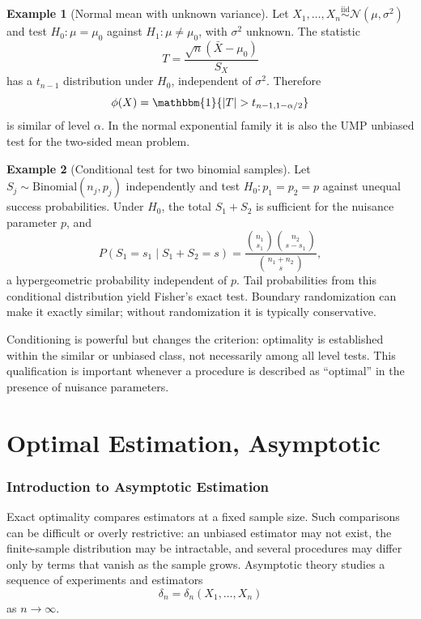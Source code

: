 \documentclass[12pt,oneside]{book}
\numberwithin{equation}{section}
\theoremstyle{definition}
\newtheorem{example}{Example}[section]
\theoremstyle{plain}
\theoremstyle{remark}
\newcommand{\ind}{\mathbbm{1}}
\newcommand{\iid}{\overset{\text{iid}}{\sim}}
\newcommand{\abs}[1]{\left\lvert #1 \right\rvert}
\newcommand{\Normal}{\mathcal{N}}
\newcommand{\Bin}{\mathrm{Binomial}}
\begin{document}
\begin{example}[Normal mean with unknown variance]
Let $X_1,\ldots,X_n\iid\Normal(\mu,\sigma^2)$ and test
$H_0:\mu=\mu_0$ against $H_1:\mu\neq\mu_0$, with $\sigma^2$ unknown.  The
statistic
\[
    T=\frac{\sqrt n(\bar X-\mu_0)}{S_X}
\]
has a $t_{n-1}$ distribution under $H_0$, independent of $\sigma^2$.
Therefore
\[
    \phi(X)=\ind\{\abs T>t_{n-1,1-\alpha/2}\}
\]
is similar of level $\alpha$.  In the normal exponential family it is also
the UMP unbiased test for the two-sided mean problem.
\end{example}

\begin{example}[Conditional test for two binomial samples]
Let $S_j\sim\Bin(n_j,p_j)$ independently and test
$H_0:p_1=p_2=p$ against unequal success probabilities.  Under $H_0$, the
total $S_1+S_2$ is sufficient for the nuisance parameter $p$, and
\[
 P(S_1=s_1\mid S_1+S_2=s)
 =\frac{\binom{n_1}{s_1}\binom{n_2}{s-s_1}}
        {\binom{n_1+n_2}{s}},
\]
a hypergeometric probability independent of $p$.  Tail probabilities from
this conditional distribution yield Fisher's exact test.  Boundary
randomization can make it exactly similar; without randomization it is
typically conservative.
\end{example}

Conditioning is powerful but changes the criterion: optimality is established
within the similar or unbiased class, not necessarily among all level tests.
This qualification is important whenever a procedure is described as
``optimal'' in the presence of nuisance parameters.

\part{Optimal Estimation, Asymptotic}

\section{Introduction to Asymptotic Estimation}

Exact optimality compares estimators at a fixed sample size.  Such comparisons
can be difficult or overly restrictive: an unbiased estimator may not exist,
the finite-sample distribution may be intractable, and several procedures may
differ only by terms that vanish as the sample grows.  Asymptotic theory
studies a sequence of experiments and estimators
\[
    \delta_n=\delta_n(X_1,\ldots,X_n)
\]
as $n\to\infty$.
\end{document}
